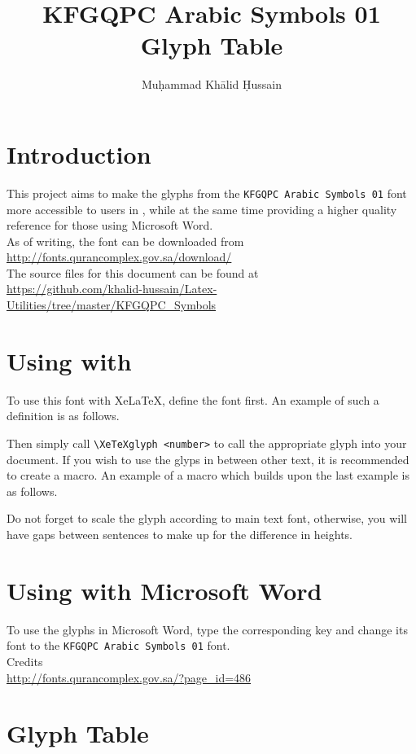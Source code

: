 \documentclass[oneside]{article}
\author{Muḥammad Khālid Ḥussain}
\title{KFGQPC Arabic Symbols 01 Glyph Table}
\date{\Hijritoday}%
\begin{document}
\maketitle

\begin{center}
\end{center}

\section{Introduction}

This project aims to make the glyphs from the \verb$KFGQPC Arabic Symbols 01$ 
font more accessible to users in \XeLaTeX, while at the same time providing a 
higher quality reference for those using Microsoft Word.\\

As of writing, the font can be downloaded from\\
\url{http://fonts.qurancomplex.gov.sa/download/}\\

The source files for this document can be found at\\
\url{https://github.com/khalid-hussain/Latex-Utilities/tree/master/KFGQPC_Symbols}

\section{Using with \XeLaTeX}

To use this font with XeLaTeX, define the font first. An example of such a 
definition is as follows.

  \begin{code}
  \newfontfamily{}
  \end{code}

Then simply call \verb$\XeTeXglyph <number>$ to call the appropriate glyph into 
your document. If you wish to use the glyps in between other text, it is 
recommended to create a macro. An example of a macro which builds upon the last 
example is as follows.


Do not forget to scale the glyph according to main text font, otherwise, you 
will have gaps between sentences to make up for the difference in 
heights.

\section{Using with Microsoft Word}

To use the glyphs in Microsoft Word, type the corresponding key and change its 
font to the \verb$KFGQPC Arabic Symbols 01$ font.\\

Credits\\
\url{http://fonts.qurancomplex.gov.sa/?page_id=486}

\newpage

\section{Glyph Table}


\end{document}
